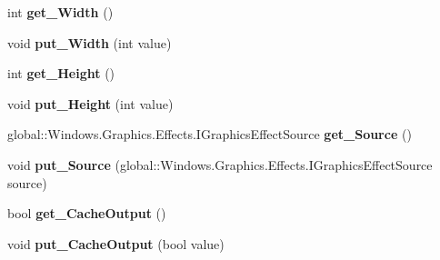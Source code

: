 \begin{DoxyCompactItemize}
int {\bfseries get\+\_\+\+Width} ()
\item 
\mbox{\label{class_microsoft_1_1_graphics_1_1_canvas_1_1_effects_1_1_morphology_effect_ac3f128cf3f9dcffa2e7ed06b0a827404}} 
void {\bfseries put\+\_\+\+Width} (int value)
\item 
\mbox{\label{class_microsoft_1_1_graphics_1_1_canvas_1_1_effects_1_1_morphology_effect_abcfe446fe92397d1c11d0b6227c48e3e}} 
int {\bfseries get\+\_\+\+Height} ()
\item 
\mbox{\label{class_microsoft_1_1_graphics_1_1_canvas_1_1_effects_1_1_morphology_effect_a8952cddc9fba06db55a0f9b692f3a53d}} 
void {\bfseries put\+\_\+\+Height} (int value)
\item 
\mbox{\label{class_microsoft_1_1_graphics_1_1_canvas_1_1_effects_1_1_morphology_effect_a3a2a845c602a6a0210a1eec2fde425ce}} 
global\+::\+Windows.\+Graphics.\+Effects.\+I\+Graphics\+Effect\+Source {\bfseries get\+\_\+\+Source} ()
\item 
\mbox{\label{class_microsoft_1_1_graphics_1_1_canvas_1_1_effects_1_1_morphology_effect_ae949c76c82e06342011eb1752f181098}} 
void {\bfseries put\+\_\+\+Source} (global\+::\+Windows.\+Graphics.\+Effects.\+I\+Graphics\+Effect\+Source source)
\item 
\mbox{\label{class_microsoft_1_1_graphics_1_1_canvas_1_1_effects_1_1_morphology_effect_a77f71f5925758effa265f4eeeb2f6f4a}} 
bool {\bfseries get\+\_\+\+Cache\+Output} ()
\item 
\mbox{\label{class_microsoft_1_1_graphics_1_1_canvas_1_1_effects_1_1_morphology_effect_ad7cedb874a08fef65c195124455c9138}} 
void {\bfseries put\+\_\+\+Cache\+Output} (bool value)
\item 
\mbox{\label{class_microsoft_1_1_graphics_1_1_canvas_1_1_effects_1_1_morphology_effect_a35ea5c10eb956a33432ecf7e5554f786}} 

\end{DoxyCompactItemize}
